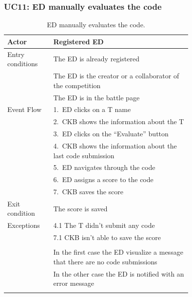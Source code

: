 \subsubsection*{UC11: ED manually evaluates the code}
\begin{center}
  \begin{longtable}{l|p{0.75\linewidth}}
    \hline
    Actor & Registered ED \\
    \hline
    Entry conditions & The ED is already registered  \\
    & The ED is the creator or a collaborator of the competition \\
    & The ED is in the battle page \\
    \hline
    Event Flow & 1.\ ED clicks on a T name \\
    & 2.\ CKB shows the information about the T \\
    & 3.\ ED clicks on the “Evaluate” button \\
    & 4.\ CKB shows the information about the last code submission \\
    & 5.\ ED navigates through the code \\
    & 6.\ ED assigns a score to the code \\
    & 7.\ CKB saves the score \\
    \hline
    Exit condition &  The score is saved \\
    \hline
    Exceptions & 4.1 The T didn't submit any code \\
    & 7.1 CKB isn’t able to save the score \\ \\
    & In the first case the ED visualize a message that there are no code submissions \\
    & In the other case the ED is notified with an error message \\
    \hline
    \caption{ED manually evaluates the code.}
    \label{tab: ED_evaluate_code}
  \end{longtable}


\end{center}
